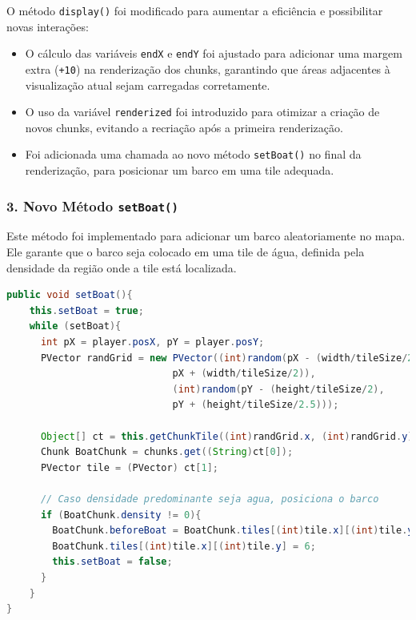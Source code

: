 \documentclass[
	12pt,				%
	oneside,			%
	a4paper,			%
	english,			%
	brazil,				%
	]{abntex2}
\begin{document}
{O método \texttt{display()} foi modificado para aumentar a eficiência e possibilitar novas interações:

\begin{itemize}
    \item O cálculo das variáveis \texttt{endX} e \texttt{endY} foi ajustado para adicionar uma margem extra (\texttt{+10}) na renderização dos chunks, garantindo que áreas adjacentes à visualização atual sejam carregadas corretamente.
    \item O uso da variável \texttt{renderized} foi introduzido para otimizar a criação de novos chunks, evitando a recriação após a primeira renderização.
    \item Foi adicionada uma chamada ao novo método \texttt{setBoat()} no final da renderização, para posicionar um barco em uma tile adequada.
\end{itemize}

\subsubsection{3. Novo Método \texttt{setBoat()}}

Este método foi implementado para adicionar um barco aleatoriamente no mapa. Ele garante que o barco seja colocado em uma tile de água, definida pela densidade da região onde a tile está localizada.

\begin{lstlisting}[language=Java, caption=Método \texttt{setBoat()} para posicionar o barco em tiles de água.]
public void setBoat(){
    this.setBoat = true;
    while (setBoat){
      int pX = player.posX, pY = player.posY;
      PVector randGrid = new PVector((int)random(pX - (width/tileSize/2), 
                             pX + (width/tileSize/2)), 
                             (int)random(pY - (height/tileSize/2), 
                             pY + (height/tileSize/2.5)));
      
      Object[] ct = this.getChunkTile((int)randGrid.x, (int)randGrid.y);
      Chunk BoatChunk = chunks.get((String)ct[0]);
      PVector tile = (PVector) ct[1];
      
      // Caso densidade predominante seja agua, posiciona o barco
      if (BoatChunk.density != 0){
        BoatChunk.beforeBoat = BoatChunk.tiles[(int)tile.x][(int)tile.y];
        BoatChunk.tiles[(int)tile.x][(int)tile.y] = 6;
        this.setBoat = false;
      }
    }
}
\end{lstlisting}

}
\end{document}
